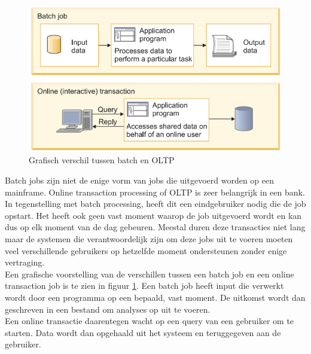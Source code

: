 \begin{figure}[ph!]
    \centering
    \includegraphics[width=400pt]{./graphics/BatchVSOnline.png}
    \caption{Grafisch verschil tussen batch en OLTP \autocite{IBMb}}
    \label{fig:online}
\end{figure}


Batch jobs zijn niet de enige vorm van jobs die uitgevoerd worden op een mainframe. Online transaction processing of OLTP is zeer belangrijk in een bank. In tegenstelling met batch processing, heeft dit een eindgebruiker nodig die de job opstart. Het heeft ook geen vast moment waarop de job uitgevoerd wordt en kan dus op elk moment van de dag gebeuren. Meestal duren deze transacties niet lang maar de systemen die verantwoordelijk zijn om deze jobs uit te voeren moeten veel verschillende gebruikers op hetzelfde moment ondersteunen zonder enige vertraging. \autocite{IBMb} \\

Een grafische voorstelling van de verschillen tussen een batch job en een online transaction job is te zien in figuur \ref{fig:online}. Een batch job heeft input die verwerkt wordt door een programma op een bepaald, vast moment. De uitkomst wordt dan geschreven in een bestand om analyses op uit te voeren. \\
Een online transactie daarentegen wacht op een query van een gebruiker om te starten. Data wordt dan opgehaald uit het systeem en teruggegeven aan de gebruiker. \autocite{IBMb}


